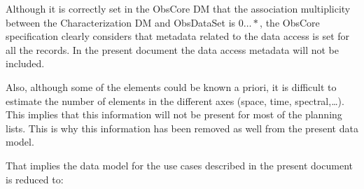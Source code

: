\documentclass[11pt,a4paper]{ivoa}
\begin{document}
Although it is correctly set in the ObsCore DM that the association multiplicity between the Characterization DM and ObsDataSet is $0\ldots\ast$, the ObsCore specification clearly considers that metadata related to the data access is set for all the records. In the present document the data access metadata will not be included.

Also, although some of the elements could be known a priori, it is difficult to estimate the number of elements in the different axes (space, time, spectral,\dots). This implies that this information will not be present for most of the planning lists. This is why this information has been removed as well from the present data model.

That implies the data model for the use cases described in the present document is reduced to:
\end{document}
